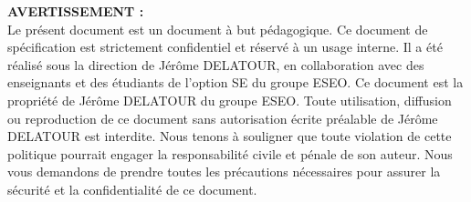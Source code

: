 \noindent %
\textbf{AVERTISSEMENT :} %
\vspace{3mm} \\
Le présent document est un document à but pédagogique.  
Ce document de spécification est strictement confidentiel et réservé à un usage interne. 
Il a été réalisé sous la direction de Jérôme DELATOUR, en collaboration avec des enseignants 
et des étudiants de l'option SE du groupe ESEO. Ce document est la propriété de Jérôme DELATOUR du groupe ESEO.
Toute utilisation, diffusion ou reproduction de ce document sans autorisation écrite préalable de Jérôme DELATOUR est interdite. 
Nous tenons à souligner que toute violation de cette politique pourrait engager la responsabilité civile et pénale de son auteur. 
Nous vous demandons de prendre toutes les précautions nécessaires pour assurer la sécurité et la confidentialité de ce document.